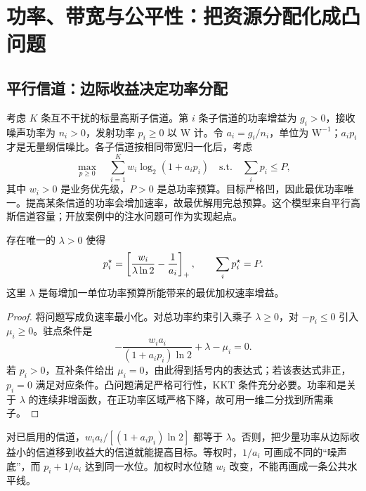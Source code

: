 \chapter{功率、带宽与公平性：把资源分配化成凸问题}
\label{chap:resource}

\section{平行信道：边际收益决定功率分配}
考虑 $K$ 条互不干扰的标量高斯子信道。第 $i$ 条子信道的功率增益为 $g_i>0$，接收噪声功率为 $n_i>0$，发射功率 $p_i\geq0$ 以 W 计。令 $a_i=g_i/n_i$，单位为 $\mathrm{W}^{-1}$；$a_i p_i$ 才是无量纲信噪比。各子信道按相同带宽归一化后，考虑
\begin{equation}
 \max_{p\geq0}\quad \sum_{i=1}^K w_i\log_2(1+a_i p_i)
 \quad\text{s.t.}\quad \sum_i p_i\leq P,
 \label{eq:weighted-water}
\end{equation}
其中 $w_i>0$ 是业务优先级，$P>0$ 是总功率预算。目标严格凹，因此最优功率唯一。提高某条信道的功率会增加速率，故最优解用完总预算。这个模型来自平行高斯信道容量；开放案例中的注水问题可作为实现起点\cite{tse2005,cvxexamples,cvxpyexamples}。

\begin{proposition}[加权注水]
存在唯一的 $\lambda>0$ 使得
\begin{equation}
 p_i^\star=\left[\frac{w_i}{\lambda\ln2}-\frac1{a_i}\right]_+,
 \qquad \sum_i p_i^\star=P.
 \label{eq:water-formula}
\end{equation}
这里 $\lambda$ 是每增加一单位功率预算所能带来的最优加权速率增益。
\end{proposition}
\begin{proof}
将问题写成负速率最小化。对总功率约束引入乘子 $\lambda\geq0$，对 $-p_i\leq0$ 引入 $\mu_i\geq0$。驻点条件是
\begin{equation}
 -\frac{w_i a_i}{(1+a_i p_i)\ln2}+\lambda-\mu_i=0.
\end{equation}
若 $p_i>0$，互补条件给出 $\mu_i=0$，由此得到括号内的表达式；若该表达式非正，$p_i=0$ 满足对应条件。凸问题满足严格可行性，KKT 条件充分必要。功率和是关于 $\lambda$ 的连续非增函数，在正功率区域严格下降，故可用一维二分找到所需乘子。
\end{proof}

对已启用的信道，$w_i a_i/[(1+a_i p_i)\ln2]$ 都等于 $\lambda$。否则，把少量功率从边际收益小的信道移到收益大的信道就能提高目标。等权时，$1/a_i$ 可画成不同的“噪声底”，而 $p_i+1/a_i$ 达到同一水位。加权时水位随 $w_i$ 改变，不能再画成一条公共水平线。

